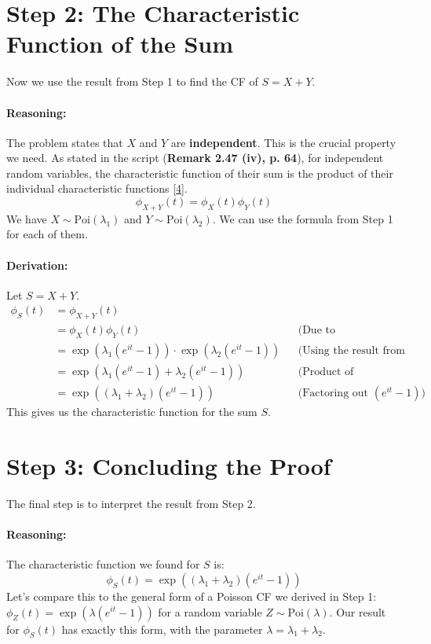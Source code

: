 \documentclass[11pt,a4paper]{article}
\begin{document}
\section{Step 2: The Characteristic Function of the Sum}
Now we use the result from Step 1 to find the CF of $S = X+Y$.

\paragraph{Reasoning:}
The problem states that $X$ and $Y$ are \textbf{independent}. This is the crucial property we need. As stated in the script (\textbf{Remark 2.47 (iv), p. 64}), for independent random variables, the characteristic function of their sum is the product of their individual characteristic functions \hyperlink{note4}{[4]}.
\[ \phi_{X+Y}(t) = \phi_X(t) \phi_Y(t) \]
We have $X \sim \text{Poi}(\lambda_1)$ and $Y \sim \text{Poi}(\lambda_2)$. We can use the formula from Step 1 for each of them.

\paragraph{Derivation:}
Let $S = X+Y$.
\begin{align*}
\phi_S(t) &= \phi_{X+Y}(t) \\
&= \phi_X(t) \phi_Y(t) && \text{(Due to independence)} \\
&= \exp(\lambda_1(e^{it} - 1)) \cdot \exp(\lambda_2(e^{it} - 1)) && \text{(Using the result from Step 1)} \\
&= \exp(\lambda_1(e^{it} - 1) + \lambda_2(e^{it} - 1)) && \text{(Product of exponentials is exp of sum)} \\
&= \exp((\lambda_1 + \lambda_2)(e^{it} - 1)) && \text{(Factoring out } (e^{it} - 1)\text{)}
\end{align*}
This gives us the characteristic function for the sum $S$.

\section{Step 3: Concluding the Proof}
The final step is to interpret the result from Step 2.

\paragraph{Reasoning:}
The characteristic function we found for $S$ is:
\[ \phi_S(t) = \exp((\lambda_1 + \lambda_2)(e^{it} - 1)) \]
Let's compare this to the general form of a Poisson CF we derived in Step 1: $\phi_Z(t) = \exp(\lambda(e^{it} - 1))$ for a random variable $Z \sim \text{Poi}(\lambda)$.
Our result for $\phi_S(t)$ has exactly this form, with the parameter $\lambda = \lambda_1 + \lambda_2$.
\end{document}
